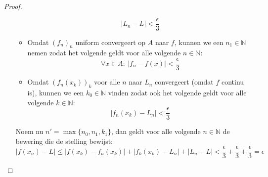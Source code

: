 \documentclass[main.tex]{subfiles}
\begin{document}
\begin{bst}
\begin{proof}
\begin{itemize}
\begin{itemize}
        \[ |L_{n}-L| < \frac{\epsilon}{3} \]
      \item Omdat $(f_{n})_{n}$ uniform convergeert op $A$ naar $f$, kunnen we een $n_{1}\in \mathbb{N}$  nemen zodat het volgende geldt voor alle volgende $n\in \mathbb{N}$:
        \[ \forall x\in A:\ |f_{n}-f(x)| < \frac{\epsilon}{3} \]
      \item Omdat
        $(f_{n}(x_{k}))_{k}$ voor alle $n$ naar $L_{n}$ convergeert (omdat $f$ continu is)\needed, kunnen we een $k_{0} \in \mathbb{N}$ vinden zodat ook het volgende geldt voor alle volgende $k \in \mathbb{N}$:
        \[ |f_{n}(x_{k}) - L_{n}| < \frac{\epsilon}{3} \]
      \end{itemize}

      Noem nu $n' = \max\{n_{0},n_{1},k_{1}\}$, dan geldt voor alle volgende $n\in \mathbb{N}$ de bewering die de stelling bewijst:
      \[ |f(x_{n})-L| \le |f(x_{k}) -f_{n}(x_{k})| + |f_{k}(x_{k})-L_{n}| + |L_{n}-L| < \frac{\epsilon}{3} + \frac{\epsilon}{3} + \frac{\epsilon}{3} = \epsilon \]
    \end{itemize}
  \end{proof}
\end{bst}
\end{document}
